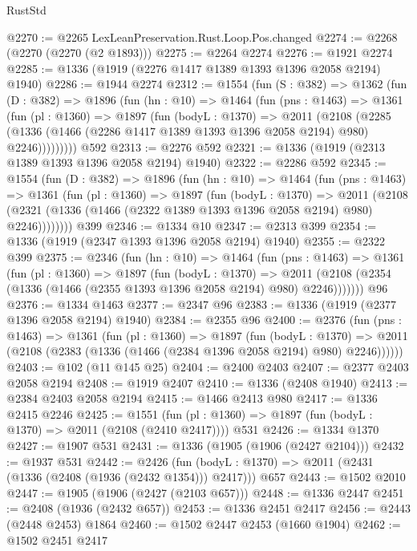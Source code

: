 \begin{lexlean}{RustStd}
\begin{coremodule}
{\begin{coremodule}
{{{{{{{{{{{{{{@2270 := @2265 LexLeanPreservation.Rust.Loop.Pos.changed
@2274 := @2268 (@2270 (@2270 (@2 @1893)))
@2275 := @2264 @2274
@2276 := @1921 @2274
@2285 := @1336 (@1919 (@2276 @1417 @1389 @1393 @1396 @2058 @2194) @1940)
@2286 := @1944 @2274
@2312 := @1554
    (fun (S : @382) =>
    @1362
      (fun (D : @382) =>
      @1896
        (fun (hn : @10) =>
        @1464
          (fun (pns : @1463) =>
          @1361
            (fun (pl : @1360) =>
            @1897
              (fun (bodyL : @1370) =>
              @2011
                (@2108
                  (@2285
                    (@1336 (@1466 (@2286 @1417 @1389 @1393 @1396 @2058 @2194) @980) @2246)))))))))
    @592
@2313 := @2276 @592
@2321 := @1336 (@1919 (@2313 @1389 @1393 @1396 @2058 @2194) @1940)
@2322 := @2286 @592
@2345 := @1554
    (fun (D : @382) =>
    @1896
      (fun (hn : @10) =>
      @1464
        (fun (pns : @1463) =>
        @1361
          (fun (pl : @1360) =>
          @1897
            (fun (bodyL : @1370) =>
            @2011
              (@2108 (@2321 (@1336 (@1466 (@2322 @1389 @1393 @1396 @2058 @2194) @980) @2246))))))))
    @399
@2346 := @1334 @10
@2347 := @2313 @399
@2354 := @1336 (@1919 (@2347 @1393 @1396 @2058 @2194) @1940)
@2355 := @2322 @399
@2375 := @2346
    (fun (hn : @10) =>
    @1464
      (fun (pns : @1463) =>
      @1361
        (fun (pl : @1360) =>
        @1897
          (fun (bodyL : @1370) =>
          @2011 (@2108 (@2354 (@1336 (@1466 (@2355 @1393 @1396 @2058 @2194) @980) @2246)))))))
    @96
@2376 := @1334 @1463
@2377 := @2347 @96
@2383 := @1336 (@1919 (@2377 @1396 @2058 @2194) @1940)
@2384 := @2355 @96
@2400 := @2376
    (fun (pns : @1463) =>
    @1361
      (fun (pl : @1360) =>
      @1897
        (fun (bodyL : @1370) =>
        @2011 (@2108 (@2383 (@1336 (@1466 (@2384 @1396 @2058 @2194) @980) @2246))))))
@2403 := @102 (@11 @145 @25)
@2404 := @2400 @2403
@2407 := @2377 @2403 @2058 @2194
@2408 := @1919 @2407
@2410 := @1336 (@2408 @1940)
@2413 := @2384 @2403 @2058 @2194
@2415 := @1466 @2413 @980
@2417 := @1336 @2415 @2246
@2425 := @1551 (fun (pl : @1360) => @1897 (fun (bodyL : @1370) => @2011 (@2108 (@2410 @2417)))) @531
@2426 := @1334 @1370
@2427 := @1907 @531
@2431 := @1336 (@1905 (@1906 (@2427 @2104)))
@2432 := @1937 @531
@2442 := @2426
    (fun (bodyL : @1370) => @2011 (@2431 (@1336 (@2408 (@1936 (@2432 @1354))) @2417)))
    @657
@2443 := @1502 @2010
@2447 := @1905 (@1906 (@2427 (@2103 @657)))
@2448 := @1336 @2447
@2451 := @2408 (@1936 (@2432 @657))
@2453 := @1336 @2451 @2417
@2456 := @2443 (@2448 @2453) @1864
@2460 := @1502 @2447 @2453 (@1660 @1904)
@2462 := @1502 @2451 @2417
}}}}}}}}}}}}}}
\end{coremodule}}
\end{coremodule}
\end{lexlean}
